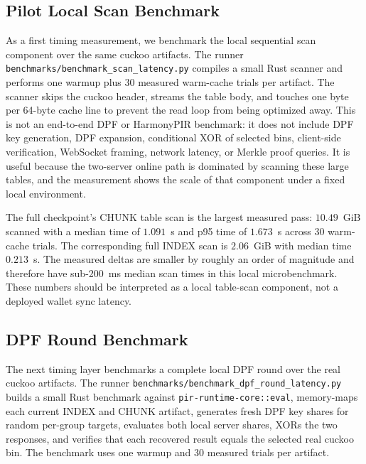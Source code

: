 \subsection{Pilot Local Scan Benchmark}

As a first timing measurement, we benchmark the local sequential scan component over the same cuckoo artifacts. The runner \texttt{benchmarks/benchmark\_scan\_latency.py} compiles a small Rust scanner and performs one warmup plus 30 measured warm-cache trials per artifact. The scanner skips the cuckoo header, streams the table body, and touches one byte per 64-byte cache line to prevent the read loop from being optimized away. This is not an end-to-end DPF or HarmonyPIR benchmark: it does not include DPF key generation, DPF expansion, conditional XOR of selected bins, client-side verification, WebSocket framing, network latency, or Merkle proof queries. It is useful because the two-server online path is dominated by scanning these large tables, and the measurement shows the scale of that component under a fixed local environment.



The full checkpoint's CHUNK table scan is the largest measured pass: $10.49$~GiB scanned with a median time of $1.091$~s and p95 time of $1.673$~s across 30 warm-cache trials. The corresponding full INDEX scan is $2.06$~GiB with median time $0.213$~s. The measured deltas are smaller by roughly an order of magnitude and therefore have sub-200~ms median scan times in this local microbenchmark. These numbers should be interpreted as a local table-scan component, not a deployed wallet sync latency.

\subsection{DPF Round Benchmark}

The next timing layer benchmarks a complete local DPF round over the real cuckoo artifacts. The runner \texttt{benchmarks/benchmark\_dpf\_round\_latency.py} builds a small Rust benchmark against \texttt{pir-runtime-core::eval}, memory-maps each current INDEX and CHUNK artifact, generates fresh DPF key shares for random per-group targets, evaluates both local server shares, XORs the two responses, and verifies that each recovered result equals the selected real cuckoo bin. The benchmark uses one warmup and 30 measured trials per artifact.



